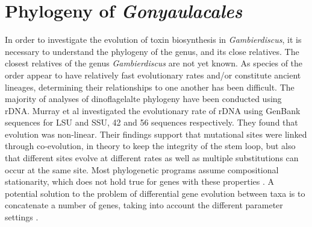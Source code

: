 \documentclass[12pt]{article}
\begin{document}
\section{Phylogeny of \emph{Gonyaulacales}}
In order to investigate the evolution of toxin biosynthesis in \textit{Gambierdiscus}, it is necessary to understand the phylogeny of the genus, and its close relatives. The closest relatives of the genus \textit{Gambierdiscus} are not yet known.  As species of the order appear to have relatively fast evolutionary rates and/or constitute ancient lineages, determining their relationships to one another has been difficult. The majority of analyses of dinoflagelalte phylogeny have been conducted using rDNA. Murray et al investigated the evolutionary rate of rDNA using GenBank sequences for LSU and SSU, 42 and 56 sequences respectively. They found that evolution was non-linear. Their findings support that mutational sites were linked through co-evolution, in theory to keep the integrity of the stem loop, but also that different sites evolve at different rates as well as multiple substitutions can occur at the same site. Most phylogenetic programs assume compositional stationarity, which does not hold true for genes with these properties \cite{murray2005improving}. A potential solution to the problem of differential gene evolution between taxa is to concatenate a number of genes, taking into account the different parameter settings \cite{gontcharov2004combined,pupko2002combining}.\\
\end{document}
